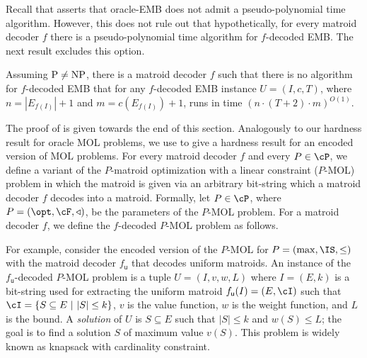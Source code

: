 Recall that  asserts that oracle-EMB does not admit a pseudo-polynomial time algorithm. However, %
 this does not rule out that hypothetically, for every matroid decoder $f$ there is a pseudo-polynomial time algorithm  %
 for $f$-decoded EMB. The next result excludes this option. %

\begin{theorem}
	\label{thm:embA}
		Assuming $\textnormal{P} \neq \textnormal{NP}$, there is a matroid decoder $f$ such that there is no algorithm  for $f$-\textnormal{decoded EMB} that for any  $f$-\textnormal{decoded EMB} instance $U =(I,c,T)$, where $n = \left|E_{f(I)}\right|+1$ and $m = c\left(E_{f(I)}\right) +1$, runs in time $ (n \cdot(T+2) \cdot m)^{O(1)}$. 
\end{theorem}

	
	
The proof of  is given towards the end of this section. Analogously to our hardness result for oracle MOL problems, we use  to give a hardness result for an encoded version of MOL problems. For every matroid decoder $f$ and every $P \in \cP$, we define a variant of the $P$-{\sc matroid optimization with a linear constraint ($P$-MOL)} problem %
	in which the matroid is given via an arbitrary bit-string which a matroid decoder $f$ decodes into a matroid. 
	Formally, let $P \in \cP$, where $P = (\opt,\cF,\triangleleft)$, be the parameters of the $P$-MOL problem. For a matroid decoder $f$, we define the $f$-decoded $P$-MOL problem as follows.  
	
	
	For example, consider the encoded version of the %
	$P$-MOL for $P = (\max,\IS,\leq)$ with the matroid decoder $f_{\textsf{u}}$ that decodes uniform matroids. %
	An instance of the $f_{\textsf{u}}$-decoded $P$-MOL problem is a tuple $U = (I,v,w,L)$ where $I = (E,k)$ is a bit-string used for extracting the uniform matroid $f_{\textsf{u}}(I) = (E,\cI)$ such that $\cI = \{S \subseteq E~|~|S| \leq k\}$, $v$ is the value function, $w$ is the weight function, and $L$ is the bound. %
	A {\em solution} of $U$ is $S \subseteq E$ such that $|S| \leq k$ and $w(S) \leq L$; the goal is to find a solution $S$ of maximum value $v(S)$. This problem is widely known as {\sc knapsack with cardinality constraint}.  
	
